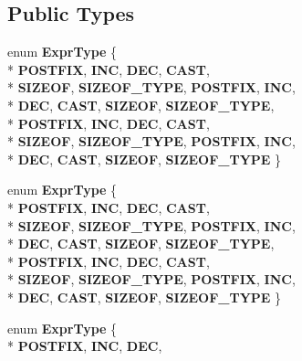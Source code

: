 \subsection*{Public Types}
\begin{DoxyCompactItemize}
\item 
enum {\bfseries Expr\-Type} \{ \\*
{\bfseries P\-O\-S\-T\-F\-I\-X}, 
{\bfseries I\-N\-C}, 
{\bfseries D\-E\-C}, 
{\bfseries C\-A\-S\-T}, 
\\*
{\bfseries S\-I\-Z\-E\-O\-F}, 
{\bfseries S\-I\-Z\-E\-O\-F\-\_\-\-T\-Y\-P\-E}, 
{\bfseries P\-O\-S\-T\-F\-I\-X}, 
{\bfseries I\-N\-C}, 
\\*
{\bfseries D\-E\-C}, 
{\bfseries C\-A\-S\-T}, 
{\bfseries S\-I\-Z\-E\-O\-F}, 
{\bfseries S\-I\-Z\-E\-O\-F\-\_\-\-T\-Y\-P\-E}, 
\\*
{\bfseries P\-O\-S\-T\-F\-I\-X}, 
{\bfseries I\-N\-C}, 
{\bfseries D\-E\-C}, 
{\bfseries C\-A\-S\-T}, 
\\*
{\bfseries S\-I\-Z\-E\-O\-F}, 
{\bfseries S\-I\-Z\-E\-O\-F\-\_\-\-T\-Y\-P\-E}, 
{\bfseries P\-O\-S\-T\-F\-I\-X}, 
{\bfseries I\-N\-C}, 
\\*
{\bfseries D\-E\-C}, 
{\bfseries C\-A\-S\-T}, 
{\bfseries S\-I\-Z\-E\-O\-F}, 
{\bfseries S\-I\-Z\-E\-O\-F\-\_\-\-T\-Y\-P\-E}
 \}
\item 
enum {\bfseries Expr\-Type} \{ \\*
{\bfseries P\-O\-S\-T\-F\-I\-X}, 
{\bfseries I\-N\-C}, 
{\bfseries D\-E\-C}, 
{\bfseries C\-A\-S\-T}, 
\\*
{\bfseries S\-I\-Z\-E\-O\-F}, 
{\bfseries S\-I\-Z\-E\-O\-F\-\_\-\-T\-Y\-P\-E}, 
{\bfseries P\-O\-S\-T\-F\-I\-X}, 
{\bfseries I\-N\-C}, 
\\*
{\bfseries D\-E\-C}, 
{\bfseries C\-A\-S\-T}, 
{\bfseries S\-I\-Z\-E\-O\-F}, 
{\bfseries S\-I\-Z\-E\-O\-F\-\_\-\-T\-Y\-P\-E}, 
\\*
{\bfseries P\-O\-S\-T\-F\-I\-X}, 
{\bfseries I\-N\-C}, 
{\bfseries D\-E\-C}, 
{\bfseries C\-A\-S\-T}, 
\\*
{\bfseries S\-I\-Z\-E\-O\-F}, 
{\bfseries S\-I\-Z\-E\-O\-F\-\_\-\-T\-Y\-P\-E}, 
{\bfseries P\-O\-S\-T\-F\-I\-X}, 
{\bfseries I\-N\-C}, 
\\*
{\bfseries D\-E\-C}, 
{\bfseries C\-A\-S\-T}, 
{\bfseries S\-I\-Z\-E\-O\-F}, 
{\bfseries S\-I\-Z\-E\-O\-F\-\_\-\-T\-Y\-P\-E}
 \}
\item 
enum {\bfseries Expr\-Type} \{ \\*
{\bfseries P\-O\-S\-T\-F\-I\-X}, 
{\bfseries I\-N\-C}, 
{\bfseries D\-E\-C}, 

\end{DoxyCompactItemize}
